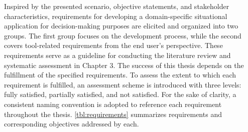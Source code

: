 Inspired by the presented scenario, objective statements, and stakeholder characteristics, requirements for developing a domain-specific situational application for decision-making purposes are elicited and organized into two groups. The first group focuses on the development process, while the second covers tool-related requirements from the end user's perspective. These requirements serve as a guideline for conducting the literature review and systematic assessment in Chapter 3.
The success of this thesis depends on the fulfillment of the specified requirements. To assess the extent to which each requirement is fulfilled, an assessment scheme is introduced with three levels: fully satisfied, partially satisfied, and not satisfied. For the sake of clarity, a consistent naming convention is adopted to reference each requirement throughout the thesis. \cref{tbl:requirements} summarizes requirements and corresponding objectives addressed by each.

